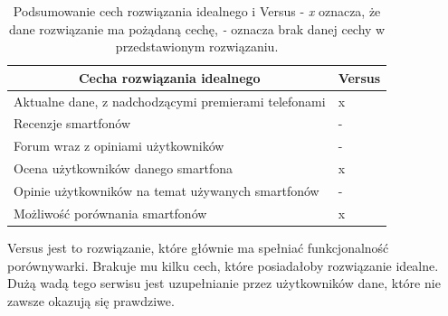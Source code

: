\begin{table}[H]
\centering
\begin{tabular}{|l|l|}
    \hline
    \multicolumn{1}{|c|}{Cecha rozwiązania idealnego}    & \multicolumn{1}{c|}{Versus} \\ \hline
    Aktualne dane, z nadchodzącymi premierami telefonami & x                             \\ \hline
    Recenzje smartfonów                                  & -                                \\ \hline
    Forum wraz z opiniami użytkowników                   & -                                \\ \hline
    Ocena użytkowników danego smartfona                  & x                             \\ \hline
    Opinie użytkowników na temat używanych smartfonów    & -                                \\ \hline
    Możliwość porównania smartfonów                      & x                                \\ \hline
\end{tabular}
\caption{Podsumowanie cech rozwiązania idealnego i Versus - \textit{x} oznacza, że dane rozwiązanie ma pożądaną cechę, \textit{-} oznacza brak danej cechy w przedstawionym rozwiązaniu.}
\label{comparison_versus}
\end{table}
Versus jest to rozwiązanie, które głównie ma spełniać funkcjonalność porównywarki. Brakuje mu kilku cech, które posiadałoby rozwiązanie idealne. Dużą wadą tego serwisu jest uzupełnianie przez użytkowników dane, które nie zawsze okazują się prawdziwe.